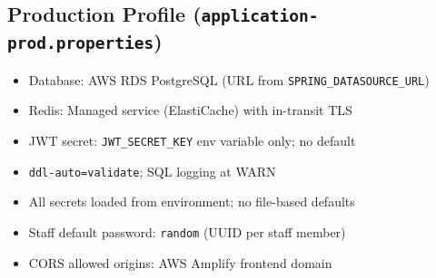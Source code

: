 \subsection{Production Profile (\texttt{application-prod.properties})}
\begin{itemize}
    \item Database: AWS RDS PostgreSQL (URL from \texttt{SPRING\_DATASOURCE\_URL})
    \item Redis: Managed service (ElastiCache) with in-transit TLS
    \item JWT secret: \texttt{JWT\_SECRET\_KEY} env variable only; no default
    \item \texttt{ddl-auto=validate}; SQL logging at WARN
    \item All secrets loaded from environment; no file-based defaults
    \item Staff default password: \texttt{random} (UUID per staff member)
    \item CORS allowed origins: AWS Amplify frontend domain
\end{itemize}
